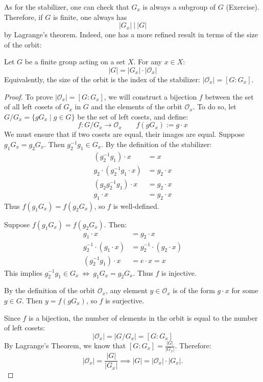 As for the stabilizer, one can check that $G_x$ is always a subgroup of $G$ (Exercise). Therefore, if $G$ is finite, one always has
$$|G_x|\ \Big|\ |G|$$
by Lagrange's theorem. Indeed, one has a more refined result in terms of the size of the orbit:
\begin{theorem}
Let $G$ be a finite group acting on a set $X$. For any $x \in X$:
\[ |G| = |G_x| \cdot |\mathcal{O}_x| \]
Equivalently, the size of the orbit is the index of the stabilizer: $|\mathcal{O}_x| = [G : G_x]$.
\end{theorem}
\begin{proof}
To prove $|\mathcal{O}_x| = [G : G_x]$, we will construct a bijection $f$ between the set of all left cosets of $G_x$ in $G$ and the elements of the orbit $\mathcal{O}_x$. To do so,
let $G/G_x = \{ gG_x \mid g \in G \}$ be the set of left cosets, and define:
\[ f: G/G_x \to \mathcal{O}_x \quad \quad f(gG_x) := g \cdot x \]
We must ensure that if two cosets are equal, their images are equal. Suppose $g_1G_x = g_2G_x$. Then $g_2^{-1}g_1 \in G_x$. By the definition of the stabilizer:
\begin{align*} (g_2^{-1}g_1) \cdot x &= x \\
 g_2 \cdot (g_2^{-1}g_1 \cdot x) &= g_2 \cdot x \\
(g_2 g_2^{-1} g_1) \cdot x &= g_2 \cdot x \\
 g_1 \cdot x &= g_2 \cdot x 
\end{align*}
Thus $f(g_1G_x) = f(g_2G_x)$, so $f$ is well-defined.

Suppose $f(g_1G_x) = f(g_2G_x)$. Then:
\begin{align*} g_1 \cdot x &= g_2 \cdot x \\
g_2^{-1} \cdot (g_1 \cdot x) &= g_2^{-1} \cdot (g_2 \cdot x) \\
 (g_2^{-1}g_1) \cdot x &= e \cdot x = x \end{align*}
This implies $g_2^{-1}g_1 \in G_x\ \Leftrightarrow \ g_1G_x = g_2G_x$. Thus $f$ is injective.

By the definition of the orbit $\mathcal{O}_x$, any element $y \in \mathcal{O}_x$ is of the form $g \cdot x$ for some $g \in G$. Then $y = f(gG_x)$, so $f$ is surjective.

Since $f$ is a bijection, the number of elements in the orbit is equal to the number of left cosets:
\[ |\mathcal{O}_x| = |G/G_x| = [G : G_x] \]
By Lagrange's Theorem, we know that $[G : G_x] = \frac{|G|}{|G_x|}$. Therefore:
\[ |\mathcal{O}_x| = \frac{|G|}{|G_x|} \implies |G| = |\mathcal{O}_x| \cdot |G_x|. \]
\end{proof}


